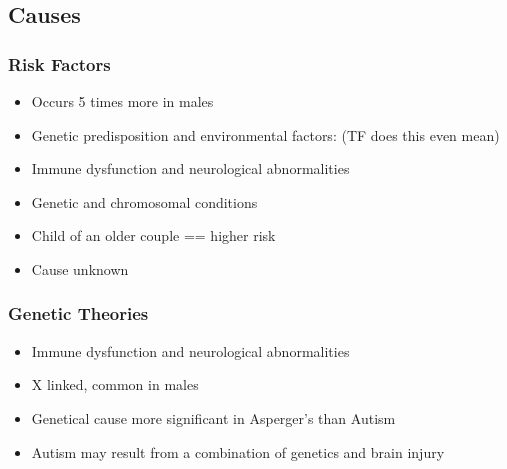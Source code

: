 \documentclass[journal]{IEEEtran}
\begin{document}
\subsection{Causes}
\subsubsection{Risk Factors}
\begin{itemize}
\item Occurs 5 times more in males
\item Genetic predisposition and environmental factors: (TF does this even mean)
\item Immune dysfunction and neurological abnormalities
\item Genetic and chromosomal conditions
\item Child of an older couple == higher risk
\item Cause unknown
\end{itemize}
\subsubsection{Genetic Theories}
\begin{itemize}
\item Immune dysfunction and neurological abnormalities
\item X linked, common in males
\item Genetical cause more significant in Asperger's than Autism
\item Autism may result from a combination of genetics and brain injury
\end{itemize}
\end{document}
